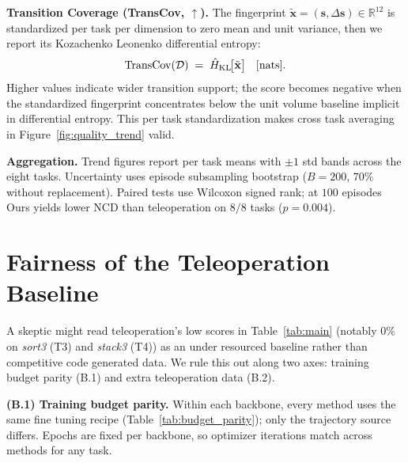 \documentclass{article}
\begin{document}
\textbf{Transition Coverage (TransCov, $\uparrow$).}
The fingerprint $\tilde{\mathbf{x}}\!=\!(\mathbf{s},\Delta\mathbf{s})\!\in\!\mathbb{R}^{12}$ is standardized per task per dimension to zero mean and unit variance, then we report its Kozachenko Leonenko differential entropy:
\begin{equation} \small
\mathrm{TransCov}(\mathcal{D}) \;=\; \hat H_{\mathrm{KL}}\!\bigl[\tilde{\mathbf{x}}\bigr]\quad[\mathrm{nats}].
\label{eq:metric-transcov}
\end{equation}
Higher values indicate wider transition support; the score becomes negative when the standardized fingerprint concentrates below the unit volume baseline implicit in differential entropy. This per task standardization makes cross task averaging in Figure~\ref{fig:quality_trend} valid.

\textbf{Aggregation.} Trend figures report per task means with $\pm 1$ std bands across the eight tasks. Uncertainty uses episode subsampling bootstrap ($B\!=\!200$, $70\%$ without replacement). Paired tests use Wilcoxon signed rank; at $100$ episodes Ours yields lower NCD than teleoperation on $8/8$ tasks ($p\!=\!0.004$).

\section{Fairness of the Teleoperation Baseline}
\label{app:teleop}

A skeptic might read teleoperation's low scores in Table~\ref{tab:main} (notably
$0\%$ on \textit{sort3} (T3) and \textit{stack3} (T4)) as an under resourced
baseline rather than competitive code generated data. We rule this out along two
axes: training budget parity (B.1) and extra teleoperation data (B.2).

\textbf{(B.1) Training budget parity.}
Within each backbone, every method uses the same fine tuning recipe
(Table~\ref{tab:budget_parity}); only the trajectory source differs. Epochs are
fixed per backbone, so optimizer iterations match across methods for any task.
\end{document}
